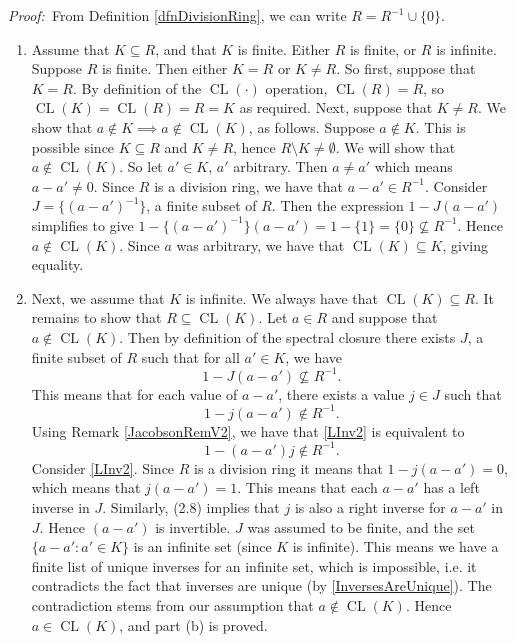 \documentclass[12pt, oneside]{book}
\newcommand{\proof}{{\noindent \it Proof:~}}
\def\CL{\operatorname{CL}}
\begin{document}
\proof \space From Definition \ref{dfnDivisionRing}, we can write $R = R^{-1} \cup \{0\}$. 
\vskip 0.3cm
\begin{enumerate}[label=(\alph*)]
\item Assume that $K \subseteq R$, and that $K$ is finite. 
Either $R$ is finite, or $R$ is infinite. Suppose $R$ is finite. Then either 
$K = R$ or $K \neq R$. 
\vskip 0.3cm
\noindent So first, suppose that $K = R$. By definition of the $\CL(\cdot)$ operation, 
$\CL(R) = R$, so 
$\CL(K) = \CL(R) = R = K$ as required. 
\vskip 0.3cm
\noindent Next, suppose that $K \neq R$. We show that $a \notin K \implies a \notin \CL(K)$, 
as follows. 
Suppose $a \not \in K$. 
This is possible since $K \subseteq R$ and $K \neq R$, hence $R \setminus K \not = \emptyset$. 
We will show that $a \not \in \CL(K)$. So let $a' \in K$, $a'$ arbitrary. Then $a \not = a'$ 
which means $a - a' \not = 0$. 
Since $R$ is a division ring, we have that $a - a' \in R^{-1}$. Consider  $J=\{(a - a')^{-1}\}$, 
a finite subset of $R$. Then the expression $1-J( a - a')$ simplifies to give 
$1-\{(a - a')^{-1}\}(a-a')=1-\{1\}=\{0\} \not \subseteq R^{-1}$. Hence $a \not \in \CL(K)$. 
Since $a$ was arbitrary, we have that $\CL(K) \subseteq K$, giving equality.

\item Next, we assume that $K$ is infinite. 
We always have that $\CL(K) \subseteq R$. It remains to show that $R \subseteq \CL(K)$. 
Let $a \in R$ and suppose that $a \not \in \CL(K)$. Then by definition of the spectral closure 
there exists $J$, a finite subset of $R$ such that for all $a' \in K$, 
we have 
\begin{equation} \label{LInv}
1-J(a-a') \not \subseteq R^{-1}. 
\end{equation}
\noindent This means that for each value of $a - a'$, there exists a value $j \in J$ such that 
\begin{equation}\label{LInv2}
1-j(a-a') \not \in R^{-1}. 
\end{equation}
\noindent Using Remark \ref{JacobsonRemV2}, we have that \eqref{LInv2} is equivalent to 
\begin{equation} \label{RInv}
1-(a-a')j \not \in R^{-1}.
\end{equation}
\noindent Consider \eqref{LInv2}. Since $R$ is a division ring it means that $1-j(a-a') = 0$, 
which means that $j(a-a') = 1$. This means that each $a-a'$ has a left inverse in $J$. 
Similarly, (2.8) implies that $j$ is also a right inverse for $a - a'$ in $J$. Hence $(a - a')$ is
 invertible. $J$ was assumed to be finite, and the set $\{a - a' : a' \in K \}$ is an infinite set 
 (since $K$ is infinite). This means we have a finite list of unique inverses for an infinite set, which is impossible, i.e. it contradicts the fact that inverses are unique (by \eqref{InversesAreUnique}). 
The contradiction stems from our assumption that $a \not \in \CL(K)$. Hence $a \in \CL(K)$, and 
part (b) is proved.
\end{enumerate}
\end{document}
